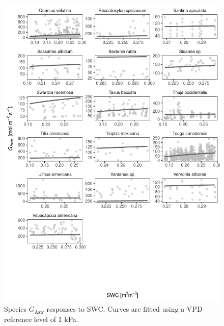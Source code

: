 \documentclass[11pt,twoside]{reedthesis}
\begin{document}
\begin{figure}[H]

{\centering \includegraphics[width=1\linewidth]{figure/appendixD/ggg15} 

}

\caption{Species $G_{\text{Asw}}$ responses to SWC. Curves are fitted using a VPD reference level of 1 kPa.}\label{fig:unnamed-chunk-31}
\end{figure}
\end{document}
